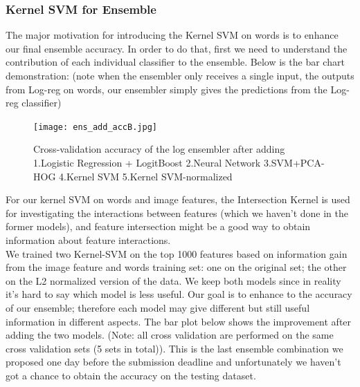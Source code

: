 \subsubsection{Kernel SVM for Ensemble}
\label{kernelsvmensemble}
The major motivation for introducing the Kernel SVM on words is to enhance our final ensemble accuracy. In order to do that, first we need to understand the contribution of each individual classifier to the ensemble. Below is the bar chart demonstration: (note when the ensembler only receives a single input, the outputs from Log-reg on words, our ensembler simply gives the predictions from the Log-reg classifier)\\
\begin{figure}
\texttt{[image: ens\_add\_accB.jpg]}
\caption{Cross-validation accuracy of the log ensembler after adding 1.Logistic Regression + LogitBoost 2.Neural Network 3.SVM+PCA-HOG 4.Kernel SVM 5.Kernel SVM-normalized}
\label{finalmodels}
\end{figure}
\noindent For our kernel SVM on words and image features, the Intersection Kernel is used for investigating the interactions between features (which we haven't done in the former models), and feature intersection might be a good way to obtain information about feature interactions.\\
We trained two Kernel-SVM on the top 1000  features based on information gain from the image feature and words training set: one on the original set; the other on the L2 normalized version of the data. We keep both models since in reality it's hard to say which model is less useful. Our goal is to enhance to the accuracy of our ensemble; therefore each model may give different but still useful information in different aspects. The bar plot below shows the improvement after adding the two models. (Note: all cross validation are performed on the same cross validation sets (5 sets in total)). This is the last ensemble combination we proposed one day before the submission deadline and unfortunately we haven't got a chance to obtain the accuracy on the testing dataset.\\

